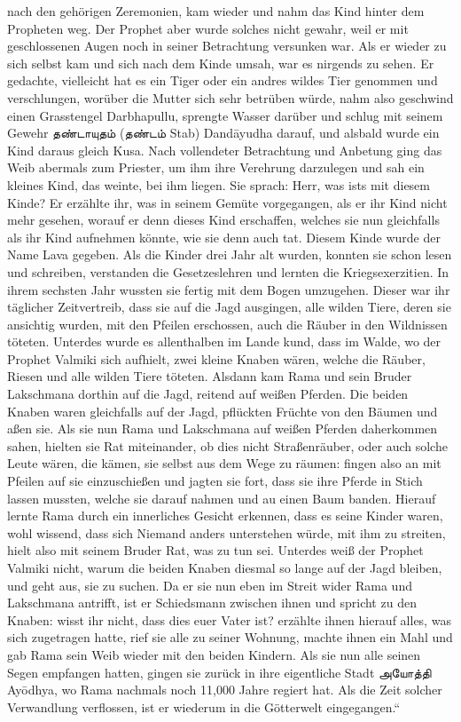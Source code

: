 \documentclass{article}
\newcommand{\TamilText}[1]{\texttamil{#1}}
\newcommand{\tam}[1]{\TamilText{#1}}
\begin{document}
nach den gehörigen Zeremonien, kam wieder und nahm das Kind hinter dem Propheten weg. Der Prophet aber wurde solches nicht gewahr, weil er mit geschlossenen Augen noch in seiner Betrachtung versunken war. Als er wieder zu sich selbst kam und sich nach dem Kinde umsah, war es nirgends zu sehen. Er gedachte, vielleicht hat es ein Tiger oder ein andres wildes Tier genommen und verschlungen, worüber die Mutter sich sehr betrüben würde, nahm also geschwind einen Grasstengel Darbhapullu, sprengte Wasser darüber und schlug mit seinem Gewehr \tam{தண்டாயுதம்} (\tam{தண்டம்} Stab) Dand\={a}yudha darauf, und alsbald wurde ein Kind daraus gleich Kusa. Nach vollendeter Betrachtung und Anbetung ging das Weib abermals zum Priester, um ihm ihre Verehrung darzulegen und sah ein kleines Kind, das weinte, bei ihm liegen. Sie sprach: Herr, was ists mit diesem Kinde? Er erzählte ihr, was in seinem Gemüte vorgegangen, als er ihr Kind nicht mehr gesehen, worauf er denn dieses Kind erschaffen, welches sie nun gleichfalls als ihr Kind aufnehmen könnte, wie sie denn auch tat. Diesem Kinde wurde der Name Lava gegeben. Als die Kinder drei Jahr alt wurden, konnten sie schon lesen und schreiben, verstanden die Gesetzeslehren und lernten die Kriegsexerzitien. In ihrem sechsten Jahr wussten sie fertig mit dem Bogen umzugehen. Dieser war ihr täglicher Zeitvertreib, dass sie auf die Jagd ausgingen, alle wilden Tiere, deren sie ansichtig wurden, mit den Pfeilen erschossen, auch die Räuber in den Wildnissen töteten. Unterdes wurde es allenthalben im Lande kund, dass im Walde, wo der Prophet Valmiki sich aufhielt, zwei kleine Knaben wären, welche die Räuber, Riesen und alle wilden Tiere töteten. Alsdann kam Rama und sein Bruder Lakschmana dorthin auf die Jagd, reitend auf weißen Pferden. Die beiden Knaben waren gleichfalls auf der Jagd, pflückten Früchte von den Bäumen und aßen sie. Als sie nun Rama und Lakschmana auf weißen Pferden daherkommen sahen, hielten sie Rat miteinander, ob dies nicht Straßenräuber, oder auch solche Leute wären, die kämen, sie selbst aus dem Wege zu räumen: fingen also an mit Pfeilen auf sie einzuschießen und jagten sie fort, dass sie ihre Pferde in Stich lassen mussten, welche sie darauf nahmen und au einen Baum banden. Hierauf lernte Rama durch ein innerliches Gesicht erkennen, dass es seine Kinder waren, wohl wissend, dass sich Niemand anders unterstehen würde, mit ihm zu streiten, hielt also mit seinem Bruder Rat, was zu tun sei. Unterdes weiß der Prophet Valmiki nicht, warum die beiden Knaben diesmal so lange auf der Jagd bleiben, und geht aus, sie zu suchen. Da er sie nun eben im Streit wider Rama und Lakschmana antrifft, ist er Schiedsmann zwischen ihnen und spricht zu den Knaben: wisst ihr nicht, dass dies euer Vater ist? erzählte ihnen hierauf alles, was sich zugetragen hatte, rief sie alle zu seiner Wohnung, machte ihnen ein Mahl und gab Rama sein Weib wieder mit den beiden Kindern. Als sie nun alle seinen Segen empfangen hatten, gingen sie zurück in ihre eigentliche Stadt \tam{அயோத்தி} Ay\={o}dhya, wo Rama nachmals noch 11,000 Jahre regiert hat. Als die Zeit solcher Verwandlung verflossen, ist er wiederum in die Götterwelt eingegangen.“
\end{document}
